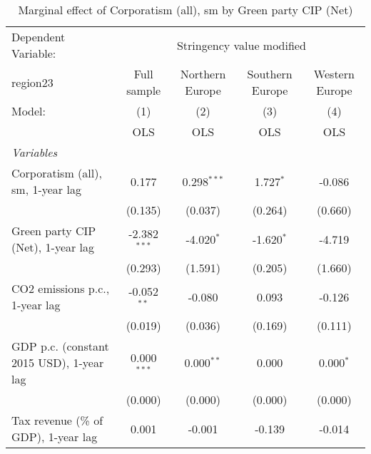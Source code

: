 
\begin{table}[htbp]
   \caption{Marginal effect of Corporatism (all), sm by Green party CIP (Net)}
   \centering
   \begin{tabular}{lcccc}
      \toprule
      Dependent Variable: & \multicolumn{4}{c}{Stringency value modified}\\
      region23                                                              & Full sample    & Northern Europe & Southern Europe & Western Europe \\   
      Model:                                                                & (1)            & (2)             & (3)             & (4)\\  
                                                                            &  OLS           & OLS             & OLS             & OLS\\  
      \midrule
      \emph{Variables}\\
      Corporatism (all), sm, 1-year lag                                     & 0.177          & 0.298$^{***}$   & 1.727$^{*}$     & -0.086\\   
                                                                            & (0.135)        & (0.037)         & (0.264)         & (0.660)\\   
      Green party CIP (Net), 1-year lag                                     & -2.382$^{***}$ & -4.020$^{*}$    & -1.620$^{*}$    & -4.719\\   
                                                                            & (0.293)        & (1.591)         & (0.205)         & (1.660)\\   
      CO2 emissions p.c., 1-year lag                                        & -0.052$^{**}$  & -0.080          & 0.093           & -0.126\\   
                                                                            & (0.019)        & (0.036)         & (0.169)         & (0.111)\\   
      GDP p.c. (constant 2015 USD), 1-year lag                              & 0.000$^{***}$  & 0.000$^{**}$    & 0.000           & 0.000$^{*}$\\   
                                                                            & (0.000)        & (0.000)         & (0.000)         & (0.000)\\   
      Tax revenue (\% of GDP), 1-year lag                                   & 0.001          & -0.001          & -0.139          & -0.014\\   

\end{tabular}
\end{table}
